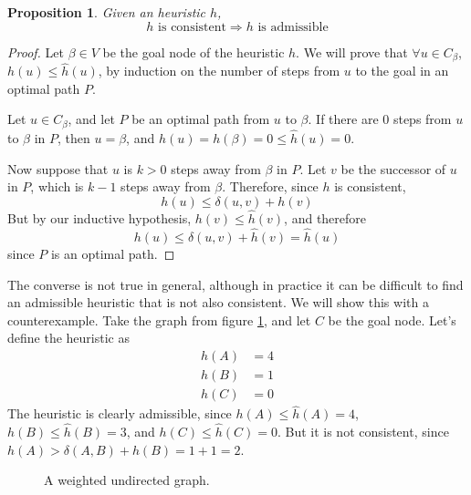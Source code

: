 \documentclass[12pt]{report}
\newtheorem{proposition}[theorem]{Proposition}
\begin{document}
\begin{proposition}
\label{prop:consistent}
Given an heuristic $h$,
\[ h \text{ is consistent} \Rightarrow h \text{ is admissible} \]
\end{proposition}
\begin{proof}
Let $\beta \in V$ be the goal node of the heuristic $h$. We will prove that $\forall u \in C_\beta$, $h(u) \leq \hat{h}(u)$, by induction on the number of steps from $u$ to the goal in an optimal path $P$.

Let $u \in C_\beta$, and let $P$ be an optimal path from $u$ to $\beta$. If there are 0 steps from $u$ to $\beta$ in $P$, then $u = \beta$, and $h(u) = h(\beta) = 0 \leq \hat{h}(u) = 0$.

Now suppose that $u$ is $k > 0$ steps away from $\beta$ in $P$. Let $v$ be the successor of $u$ in $P$, which is $k-1$ steps away from $\beta$. Therefore, since $h$ is consistent,
\[ h(u) \leq \delta(u, v) + h(v) \]
But by our inductive hypothesis, $h(v) \leq \hat{h}(v)$, and therefore
\[ h(u) \leq \delta(u, v) + \hat{h}(v) = \hat{h}(u) \]
since $P$ is an optimal path.
\end{proof}

The converse is not true in general, although in practice it can be difficult to find an admissible heuristic that is not also consistent. We will show this with a counterexample. Take the graph from figure \ref{fig:heuristic}, and let $C$ be the goal node. Let's define the heuristic as
\begin{align*}
h(A) &= 4\\
h(B) &= 1\\
h(C) &= 0
\end{align*}
The heuristic is clearly admissible, since $h(A) \leq \hat{h}(A) = 4$, $h(B) \leq \hat{h}(B) = 3$, and $h(C) \leq \hat{h}(C) = 0$. But it is not consistent, since $h(A) > \delta(A, B) + h(B) = 1 + 1 = 2$.

\begin{figure}
\centering
{}
\caption{A weighted undirected graph.}
\label{fig:heuristic}
\end{figure}
\end{document}
